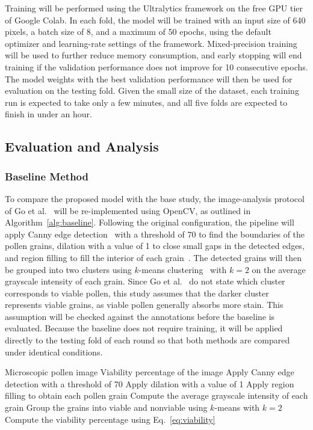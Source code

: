Training will be performed using the Ultralytics framework on the free GPU tier of Google Colab. In each fold, the model will be trained with an input size of 640 pixels, a batch size of 8, and a maximum of 50 epochs, using the default optimizer and learning-rate settings of the framework. Mixed-precision training will be used to further reduce memory consumption, and early stopping will end training if the validation performance does not improve for 10 consecutive epochs. The model weights with the best validation performance will then be used for evaluation on the testing fold. Given the small size of the dataset, each training run is expected to take only a few minutes, and all five folds are expected to finish in under an hour.

\subsection{Evaluation and Analysis}
\label{sec:m-evaluation}

\subsubsection{Baseline Method}
\label{sec:m-baseline}

To compare the proposed model with the base study, the image-analysis protocol of Go et al.~\cite{go2019} will be re-implemented using OpenCV, as outlined in Algorithm~\ref{alg:baseline}. Following the original configuration, the pipeline will apply Canny edge detection~\cite{canny1986} with a threshold of 70 to find the boundaries of the pollen grains, dilation with a value of 1 to close small gaps in the detected edges, and region filling to fill the interior of each grain~\cite{gonzalez2018}. The detected grains will then be grouped into two clusters using $k$-means clustering~\cite{lloyd1982} with $k = 2$ on the average grayscale intensity of each grain. Since Go et al.~\cite{go2019} do not state which cluster corresponds to viable pollen, this study assumes that the darker cluster represents viable grains, as viable pollen generally absorbs more stain. This assumption will be checked against the annotations before the baseline is evaluated. Because the baseline does not require training, it will be applied directly to the testing fold of each round so that both methods are compared under identical conditions.

\begin{algorithm}[H]
\caption{Baseline pollen viability identification of Go et al.~\cite{go2019}}
\label{alg:baseline}
\begin{algorithmic}[1]
\Require Microscopic pollen image
\Ensure Viability percentage of the image
\State Apply Canny edge detection with a threshold of 70
\State Apply dilation with a value of 1
\State Apply region filling to obtain each pollen grain
\State Compute the average grayscale intensity of each grain
\State Group the grains into viable and nonviable using $k$-means with $k = 2$
\State Compute the viability percentage using Eq.~\eqref{eq:viability}
\end{algorithmic}
\end{algorithm}

